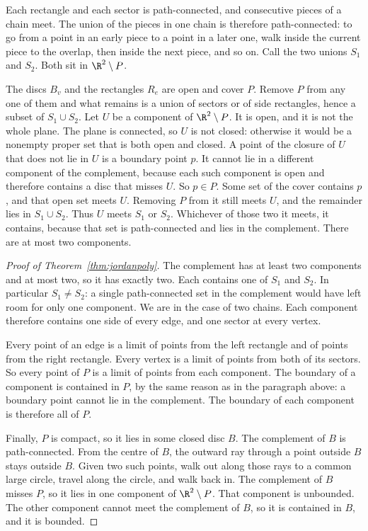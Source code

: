 Each rectangle and each sector is path-connected, and consecutive pieces of a chain meet. The union of the pieces in one chain is therefore path-connected: to go from a point in an early piece to a point in a later one, walk inside the current piece to the overlap, then inside the next piece, and so on. Call the two unions $S_1$ and $S_2$. Both sit in $\R^2\setminus P$.

The discs $B_v$ and the rectangles $R_e$ are open and cover $P$. Remove $P$ from any one of them and what remains is a union of sectors or of side rectangles, hence a subset of $S_1\cup S_2$. Let $U$ be a component of $\R^2\setminus P$. It is open, and it is not the whole plane. The plane is connected, so $U$ is not closed: otherwise it would be a nonempty proper set that is both open and closed. A point of the closure of $U$ that does not lie in $U$ is a boundary point $p$. It cannot lie in a different component of the complement, because each such component is open and therefore contains a disc that misses $U$. So $p\in P$. Some set of the cover contains $p$, and that open set meets $U$. Removing $P$ from it still meets $U$, and the remainder lies in $S_1\cup S_2$. Thus $U$ meets $S_1$ or $S_2$. Whichever of those two it meets, it contains, because that set is path-connected and lies in the complement. There are at most two components.

\begin{proof}[Proof of Theorem~\ref{thm:jordanpoly}]
The complement has at least two components and at most two, so it has exactly two. Each contains one of $S_1$ and $S_2$. In particular $S_1\ne S_2$: a single path-connected set in the complement would have left room for only one component. We are in the case of two chains. Each component therefore contains one side of every edge, and one sector at every vertex.

Every point of an edge is a limit of points from the left rectangle and of points from the right rectangle. Every vertex is a limit of points from both of its sectors. So every point of $P$ is a limit of points from each component. The boundary of a component is contained in $P$, by the same reason as in the paragraph above: a boundary point cannot lie in the complement. The boundary of each component is therefore all of $P$.

Finally, $P$ is compact, so it lies in some closed disc $B$. The complement of $B$ is path-connected. From the centre of $B$, the outward ray through a point outside $B$ stays outside $B$. Given two such points, walk out along those rays to a common large circle, travel along the circle, and walk back in. The complement of $B$ misses $P$, so it lies in one component of $\R^2\setminus P$. That component is unbounded. The other component cannot meet the complement of $B$, so it is contained in $B$, and it is bounded.
\end{proof}

